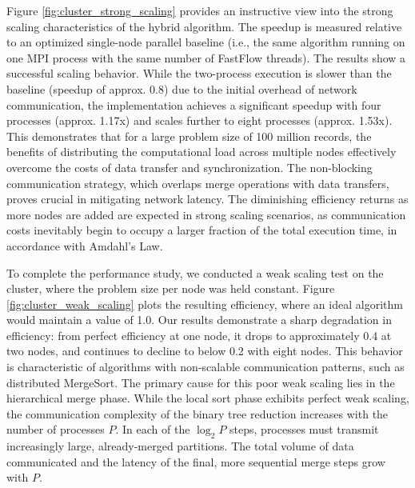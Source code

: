 \documentclass[10pt]{article}
\begin{document}
Figure \ref{fig:cluster_strong_scaling} provides an instructive view into the strong scaling characteristics of the hybrid algorithm. The speedup is measured relative to an optimized single-node parallel baseline (i.e., the same algorithm running on one MPI process with the same number of FastFlow threads). The results show a successful scaling behavior. While the two-process execution is slower than the baseline (speedup of approx. 0.8) due to the initial overhead of network communication, the implementation achieves a significant speedup with four processes (approx. 1.17x) and scales further to eight processes (approx. 1.53x). This demonstrates that for a large problem size of 100 million records, the benefits of distributing the computational load across multiple nodes effectively overcome the costs of data transfer and synchronization. The non-blocking communication strategy, which overlaps merge operations with data transfers, proves crucial in mitigating network latency. The diminishing efficiency returns as more nodes are added are expected in strong scaling scenarios, as communication costs inevitably begin to occupy a larger fraction of the total execution time, in accordance with Amdahl's Law.

To complete the performance study, we conducted a weak scaling test on the cluster, where the problem size per node was held constant. Figure \ref{fig:cluster_weak_scaling} plots the resulting efficiency, where an ideal algorithm would maintain a value of 1.0. Our results demonstrate a sharp degradation in efficiency: from perfect efficiency at one node, it drops to approximately 0.4 at two nodes, and continues to decline to below 0.2 with eight nodes. This behavior is characteristic of algorithms with non-scalable communication patterns, such as distributed MergeSort. The primary cause for this poor weak scaling lies in the hierarchical merge phase. While the local sort phase exhibits perfect weak scaling, the communication complexity of the binary tree reduction increases with the number of processes $P$. In each of the $\log_2 P$ steps, processes must transmit increasingly large, already-merged partitions. The total volume of data communicated and the latency of the final, more sequential merge steps grow with $P$.
\end{document}
